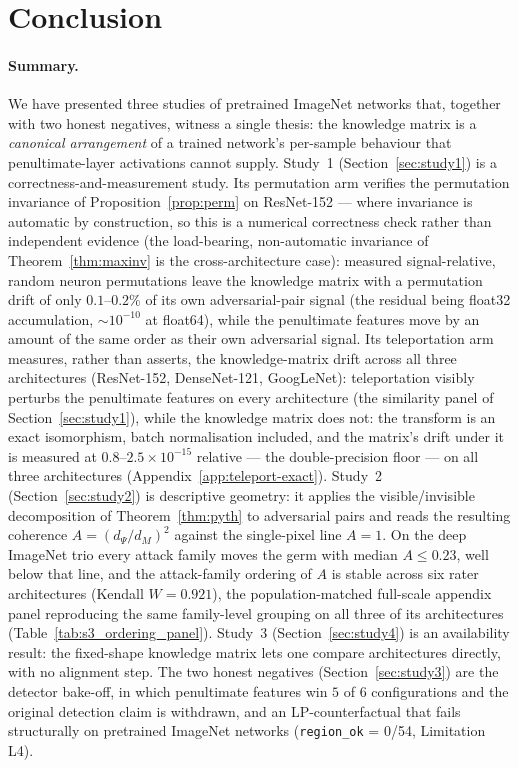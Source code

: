 \section{Conclusion}
\label{sec:conclusion}

\paragraph{Summary.}
We have presented three studies of pretrained ImageNet networks that,
together with two honest negatives, witness a single thesis: the
knowledge matrix is a \emph{canonical arrangement} of a trained network's
per-sample behaviour that penultimate-layer activations cannot supply.
Study~1 (Section~\ref{sec:study1}) is a correctness-and-measurement
study. Its permutation arm verifies the permutation invariance of
Proposition~\ref{prop:perm} on ResNet-152 --- where invariance is automatic
by construction, so this is a numerical correctness check rather than
independent evidence (the load-bearing, non-automatic invariance of
Theorem~\ref{thm:maxinv} is the cross-architecture case): measured signal-relative, random neuron
permutations leave the knowledge matrix with a permutation drift of only
$0.1$--$0.2\%$ of its own adversarial-pair signal (the residual being
float32 accumulation, $\sim10^{-10}$ at float64), while the penultimate
features move by an amount of the same order as their own adversarial
signal. Its teleportation arm measures, rather than asserts, the
knowledge-matrix drift across all three architectures (ResNet-152,
DenseNet-121, GoogLeNet): teleportation visibly perturbs the penultimate
features on every architecture (the similarity panel of
Section~\ref{sec:study1}), while the knowledge matrix does not: the transform is
an exact isomorphism, batch normalisation included, and the matrix's drift under
it is measured at $0.8$--$2.5\times10^{-15}$ relative --- the double-precision
floor --- on all three architectures (Appendix~\ref{app:teleport-exact}).
Study~2 (Section~\ref{sec:study2}) is descriptive geometry: it applies
the visible/invisible decomposition of Theorem~\ref{thm:pyth} to
adversarial pairs and reads the resulting coherence $A=(d_\Psi/d_M)^2$
against the single-pixel line $A=1$. On the deep ImageNet trio every
attack family moves the germ with median $A\le0.23$, well below that
line, and the attack-family ordering of $A$ is stable across six
rater architectures (Kendall $W=0.921$), the population-matched full-scale
appendix panel reproducing the same family-level grouping on all three of
its architectures (Table~\ref{tab:s3_ordering_panel}). Study~3
(Section~\ref{sec:study4}) is an availability result: the fixed-shape
knowledge matrix lets one compare architectures directly, with no
alignment step. The two honest negatives (Section~\ref{sec:study3}) are
the detector bake-off, in which penultimate features win $5$ of $6$
configurations and the original detection claim is withdrawn, and an
LP-counterfactual that fails structurally on pretrained ImageNet networks
(\texttt{region\_ok} = 0/54, Limitation L4).

